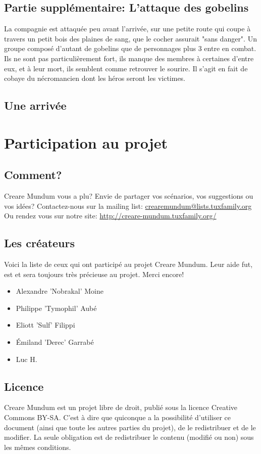 \documentclass{book}
\begin{document}
\subsection{Partie supplémentaire: L'attaque des gobelins} 
La compagnie est attaquée peu avant l'arrivée, sur une petite route qui coupe à travers un petit bois des plaines de sang, que le cocher assurait "sans danger". Un groupe composé d'autant de gobelins que de personnages plus 3 entre en combat. Ils ne sont pas particulièrement fort, ils manque des membres à certaines d'entre eux, et à leur mort, ils semblent comme retrouver le sourire. Il s'agit en fait de cobaye du nécromancien dont les héros seront les victimes. 

\subsection{Une arrivée}


\newpage
\section{Participation au projet}
\subsection{Comment?}
\hypertarget{participation}{}
Creare Mundum vous a plu? 
Envie de partager vos scénarios, vos suggestions ou vos idées?
\newline
Contactez-nous sur la mailing list: \href {mailto:crearemundum@lists.tuxfamily.org}{crearemundum@lists.tuxfamily.org}
\newline
Ou rendez vous sur notre site: \href {http://creare-mundum.tuxfamily.org/} {http://creare-mundum.tuxfamily.org/}
\subsection{Les créateurs}
Voici la liste de ceux qui ont participé au projet Creare Mundum. Leur aide fut, est et sera toujours très précieuse au projet. Merci encore!  
\begin{itemize}
\item Alexandre ’Nobrakal’ Moine 
\item Philippe ’Tymophil’ Aubé 
\item Eliott ’Sulf’ Filippi
\item Émiland ’Derec’ Garrabé
\item Luc H.
\end{itemize}
\subsection{Licence}
Creare Mundum est un projet libre de droit, publié sous la licence Creative Commons BY-SA. C'est à dire que quiconque a la possibilité d'utiliser ce document (ainsi que toute les autres parties du projet), de le redistribuer et de le modifier. La seule obligation est de redistribuer le contenu (modifié ou non) sous les mêmes conditions.
\end{document}
